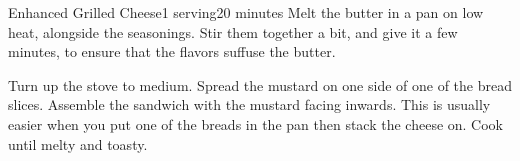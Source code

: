 \documentclass[../Cookbook.tex]{subfiles}
\begin{document}
\begin{recipe}[EnhancedGrilledCheese]{Enhanced Grilled Cheese}{1 serving}{20 minutes}
Melt the butter in a pan on low heat, alongside the seasonings.
Stir them together a bit, and give it a few minutes, to ensure that the flavors suffuse the butter.

Turn up the stove to medium.
Spread the mustard on one side of one of the bread slices.
Assemble the sandwich with the mustard facing inwards.
This is usually easier when you put one of the breads in the pan then stack the cheese on.
Cook until melty and toasty.

\end{recipe}
\end{document}
